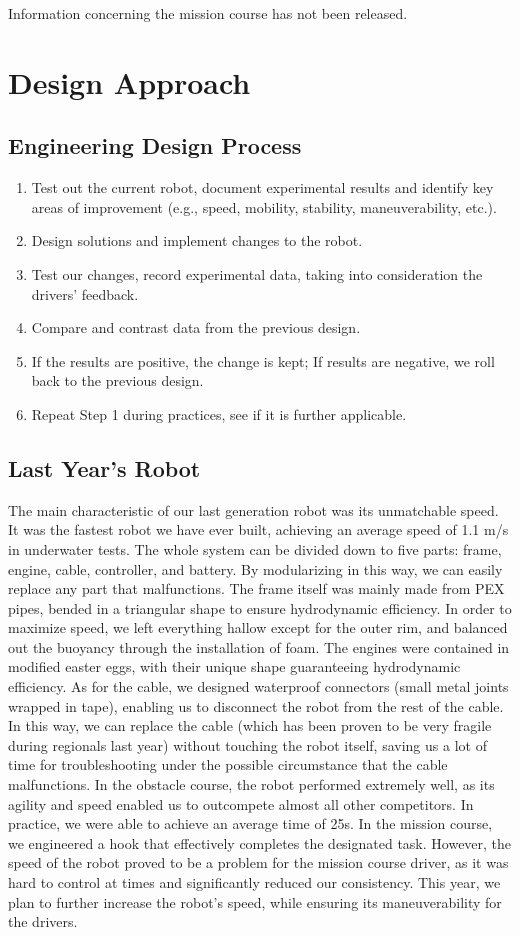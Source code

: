 \documentclass[11pt, oneside]{article}   	%
\begin{document}
Information concerning the mission course has not been released.

\section{Design Approach}
\subsection{Engineering Design Process}
\begin{enumerate}
	\item Test out the current robot, document experimental results and identify key areas of improvement (e.g., speed, mobility, stability, maneuverability, etc.).
	\item Design solutions and implement changes to the robot.
	\item Test our changes, record experimental data, taking into consideration the drivers’ feedback.
	\item Compare and contrast data from the previous design.
	\item If the results are positive, the change is kept; If results are negative, we roll back to the previous design.
	\item Repeat Step 1 during practices, see if it is further applicable.
\end{enumerate}

\subsection{Last Year's Robot}
The main characteristic of our last generation robot was its unmatchable speed. It was the fastest robot we have ever built, achieving an average speed of 1.1 m/s in underwater tests. The whole system can be divided down to five parts: frame, engine, cable, controller, and battery. By modularizing in this way, we can easily replace any part that malfunctions. The frame itself was mainly made from PEX pipes, bended in a triangular shape to ensure hydrodynamic efficiency. In order to maximize speed, we left everything hallow except for the outer rim, and balanced out the buoyancy through the installation of foam. The engines were contained in modified easter eggs, with their unique shape guaranteeing hydrodynamic efficiency. As for the cable, we designed waterproof connectors (small metal joints wrapped in tape), enabling us to disconnect the robot from the rest of the cable. In this way, we can replace the cable (which has been proven to be very fragile during regionals last year) without touching the robot itself, saving us a lot of time for troubleshooting under the possible circumstance that the cable malfunctions.
In the obstacle course, the robot performed extremely well, as its agility and speed enabled us to outcompete almost all other competitors. In practice, we were able to achieve an average time of 25s. In the mission course, we engineered a hook that effectively completes the designated task. However, the speed of the robot proved to be a problem for the mission course driver, as it was hard to control at times and significantly reduced our consistency. This year, we plan to further increase the robot’s speed, while ensuring its maneuverability for the drivers.
\end{document}

